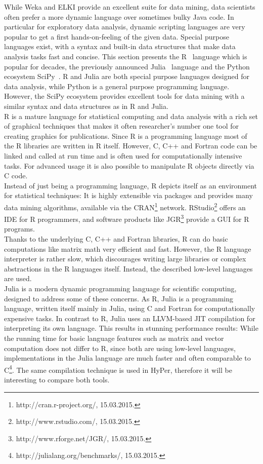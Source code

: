While Weka and ELKI provide an excellent suite for data mining, data scientists often prefer a more dynamic language over sometimes bulky Java code. In particular for exploratory data analysis, dynamic scripting languages are very popular to get a first hands-on-feeling of the given data. Special purpose languages exist, with a syntax and built-in data structures that make data analysis tasks fast and concise. This section presents the R~\parencite{R/stats} language which is popular for decades, the previously announced Julia~\parencite{DBLP:journals/corr/abs-1209-5145} language and the Python ecosystem SciPy~\parencite{scipy}. R and Julia are both special purpose languages designed for data analysis, while Python is a general purpose programming language. However, the SciPy ecosystem provides excellent tools for data mining with a similar syntax and data structures as in R and Julia.
\\
R is a mature language for statistical computing and data analysis with a rich set of graphical techniques that makes it often researcher's number one tool for creating graphics for publications. Since R is a programming language most of the R libraries are written in R itself. However, C, C++ and Fortran code can be linked and called at run time and is often used for computationally intensive tasks. For advanced usage it is also possible to manipulate R objects directly via C code.
\\
Instead of just being a programming language, R depicts itself as an environment for statistical techniques: It is highly extensible via packages and provides many data mining algorithms, available via the CRAN\footnote{http://cran.r-project.org/, 15.03.2015.} network. RStudio\footnote{http://www.rstudio.com/, 15.03.2015.} offers an IDE for R programmers, and software products like JGR\footnote{http://www.rforge.net/JGR/, 15.03.2015.} provide a GUI for R programs.
\\
Thanks to the underlying C, C++ and Fortran libraries, R can do basic computations like matrix math very efficient and fast. However, the R language interpreter is rather slow, which discourages writing large libraries or complex abstractions in the R languages itself. Instead, the described low-level languages are used.
\\
Julia is a modern dynamic programming language for scientific computing, designed to address some of these concerns. As R, Julia is a programming language, written itself mainly in Julia, using C and Fortran for computationally expensive tasks. In contrast to R, Julia uses an LLVM-based JIT compilation for interpreting its own language. This results in stunning performance results: While the running time for basic language features such as matrix and vector computation does not differ to R, since both are using low-level languages, implementations in the Julia language are much faster and often comparable to C\footnote{http://julialang.org/benchmarks/, 15.03.2015.}. The same compilation technique is used in HyPer, therefore it will be interesting to compare both tools.
